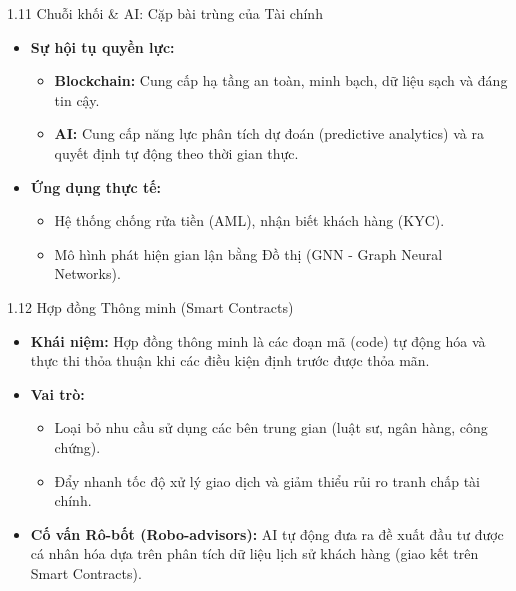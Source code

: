 \documentclass[aspectratio=169]{beamer}
\begin{document}
\begin{frame}{1.11 Chuỗi khối \& AI: Cặp bài trùng của Tài chính}
    \begin{itemize}
        \item \textbf{Sự hội tụ quyền lực:}
        \begin{itemize}
            \item \textbf{Blockchain:} Cung cấp hạ tầng an toàn, minh bạch, dữ liệu sạch và đáng tin cậy.
            \item \textbf{AI:} Cung cấp năng lực phân tích dự đoán (predictive analytics) và ra quyết định tự động theo thời gian thực.
        \end{itemize}
        \item \textbf{Ứng dụng thực tế:}
        \begin{itemize}
            \item Hệ thống chống rửa tiền (AML), nhận biết khách hàng (KYC).
            \item Mô hình phát hiện gian lận bằng Đồ thị (GNN - Graph Neural Networks).
        \end{itemize}
    \end{itemize}
\end{frame}

\begin{frame}{1.12 Hợp đồng Thông minh (Smart Contracts)}
    \begin{itemize}
        \item \textbf{Khái niệm:} Hợp đồng thông minh là các đoạn mã (code) tự động hóa và thực thi thỏa thuận khi các điều kiện định trước được thỏa mãn.
        \item \textbf{Vai trò:}
        \begin{itemize}
            \item Loại bỏ nhu cầu sử dụng các bên trung gian (luật sư, ngân hàng, công chứng).
            \item Đẩy nhanh tốc độ xử lý giao dịch và giảm thiểu rủi ro tranh chấp tài chính.
        \end{itemize}
        \item \textbf{Cố vấn Rô-bốt (Robo-advisors):} AI tự động đưa ra đề xuất đầu tư được cá nhân hóa dựa trên phân tích dữ liệu lịch sử khách hàng (giao kết trên Smart Contracts).
    \end{itemize}
\end{frame}


\end{document}

